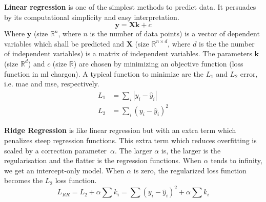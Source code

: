 %
\textbf{Linear regression} is one of the simplest methods to predict data. 
It persuades by its computational simplicity and easy interpretation. 
\begin{equation}
\mathbf{y} = \mathbf{X} \mathbf{k} +c 
\end{equation}
Where $\mathbf{y}$ (size $\mathbb{R}^n$, where $n$ is the number of data points) is a vector of dependent variables which shall be predicted and $\mathbf{X}$ (size $\mathbb{R}^{n\times d}$, where $d$ is the the number of independent variables) is a matrix of independent variables. 
The parameters $\mathbf{k}$ (size $\mathbb{R}^d$) and $c$ (size $\mathbb{R}$) are chosen by minimizing an objective function (loss function in \gls{ml} chargon).
A typical function to minimize are the $L_1$ and $L_2$ error, i.e. \gls{mae} and \gls{mse}, respectively.
\begin{align}
L_1&= \sum_i |y_i - \hat y_i| \\%
L_2&= \sum_i(y_i - \hat y_i)^2 %
\end{align}
%

\textbf{Ridge Regression} is like linear regression but with an extra term which penalizes steep regression functions.
This extra term which reduces overfitting is scaled by a correction parameter~$\alpha$. 
The larger $\alpha$ is, the larger is the regularisation and the flatter is the regression functions. 
When $\alpha$ tends to infinity, we get an intercept-only model.
When $\alpha$ is zero, the regularized loss function becomes the $L_2$ loss function.
\begin{equation}
    L_{RR} = L_2 + \alpha \sum k_i = \sum(y_i - \hat y_i)^2 + \alpha \sum k_i
\end{equation}


